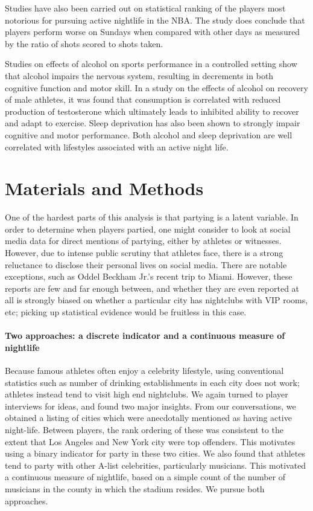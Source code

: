 \documentclass[letterpaper,12pt]{article}
\begin{document}
Studies have also been carried out on statistical ranking of the players
most notorious for pursuing active nightlife in the NBA.\cite{chase} The study
does conclude that players perform worse on Sundays when compared with other days
as measured by the ratio of shots scored to shots taken.

Studies on effects of alcohol on sports performance in a controlled setting
show that alcohol impairs the nervous system, resulting in decrements in both
cognitive function and motor skill.\cite{shirreffs} In a study on 
the effects of alcohol on recovery of male athletes, it was found that
consumption is correlated with reduced production of testosterone
which ultimately leads to inhibited ability to recover and adapt to exercise.\cite{mjbarnes}
Sleep deprivation has also been shown to strongly impair cognitive and motor performance.\cite{pilcher} Both alcohol and sleep deprivation are well correlated with lifestyles associated
with an active night life.

\section{Materials and Methods}
One of the hardest parts of this analysis is that partying is a latent variable.
In order to determine when players partied, one might consider to look at social media data
for direct mentions of partying, either by athletes or witnesses. However, due to
intense public scrutiny that athletes face, there is a strong reluctance to disclose
their personal lives on social media. There are notable exceptions, such
as Oddel Beckham Jr.'s recent trip to Miami.\cite{bleler}
However, these reports are few and far enough between,
and whether they are even reported at all is strongly biased on whether a particular city 
has nightclubs with VIP rooms, etc; picking up statistical evidence would be fruitless in this case.

\paragraph{Two approaches: a discrete indicator and a continuous measure of nightlife}
Because famous athletes often enjoy a celebrity lifestyle, using conventional statistics
such as number of drinking establishments in each city does not work; athletes instead
tend to visit high end nightclubs. We again turned to player interviews for ideas,
and found two major insights. From our conversations, 
we obtained a listing of cities which were anecdotally
mentioned as having active night-life. Between players, the rank ordering of these
was consistent to the extent that Los Angeles and New York city were top
offenders. This motivates using a binary indicator for party in these two cities. 
We also found that athletes tend to party with other A-list celebrities,
particularly musicians. This motivated a continuous measure of nightlife, based on a
simple count of the number of musicians in the county in which the stadium resides. 
We pursue both approaches.
\end{document}
